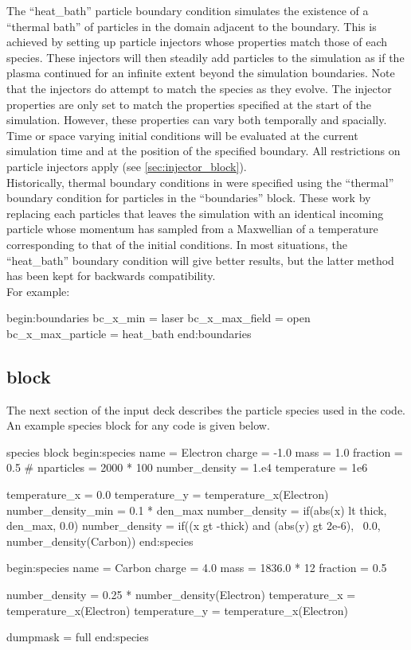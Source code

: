 The ``heat\_bath'' particle boundary condition simulates the existence of a
``thermal bath'' of particles in the domain adjacent to the boundary.
This is achieved by setting up particle injectors whose properties match those
of each species. These injectors will then steadily add particles to the
simulation as if the plasma continued for an infinite extent beyond the
simulation boundaries. Note that the injectors do  attempt to
match the species as they evolve. The injector properties are only set to match
the properties specified at the start of the simulation. However, these
properties can vary both temporally and spacially. Time or space varying
initial conditions will be evaluated at the current simulation time and at the
position of the specified boundary.
All restrictions on particle injectors apply (see \ref{sec:injector_block}).\\

Historically, thermal boundary conditions in {\EPOCH} were specified using
the ``thermal'' boundary condition for particles in the ``boundaries'' block.
These work by replacing each particles that leaves the simulation with an
identical incoming particle whose momentum has sampled from a Maxwellian of a
temperature corresponding to that of the initial conditions.
In most situations, the ``heat\_bath'' boundary condition will give better
results, but the latter method has been kept for backwards compatibility.\\

For example:

\begin{boxverbatim}
begin:boundaries
   bc_x_min = laser
   bc_x_max_field = open
   bc_x_max_particle = heat_bath
end:boundaries
\end{boxverbatim}


\subsection{\texorpdfstring
  { block}
  {           {species} block}}
\label{sec:species_block}
The next section of the input deck describes the particle species used in the
code. An example species block for any {\EPOCH} code is given below.
\begin{lboxverbatim}{species block}
begin:species
   name = Electron
   charge = -1.0
   mass = 1.0
   fraction = 0.5
   # nparticles = 2000 * 100
   number_density = 1.e4
   temperature = 1e6

   temperature_x = 0.0
   temperature_y = temperature_x(Electron)
   number_density_min = 0.1 * den_max
   number_density = if(abs(x) lt thick, den_max, 0.0)
   number_density = if((x gt -thick) and (abs(y) gt 2e-6), \
                       0.0, number_density(Carbon))
end:species

begin:species
   name = Carbon
   charge = 4.0
   mass = 1836.0 * 12
   fraction = 0.5

   number_density = 0.25 * number_density(Electron)
   temperature_x = temperature_x(Electron)
   temperature_y = temperature_x(Electron)

   dumpmask = full
end:species
\end{lboxverbatim}

